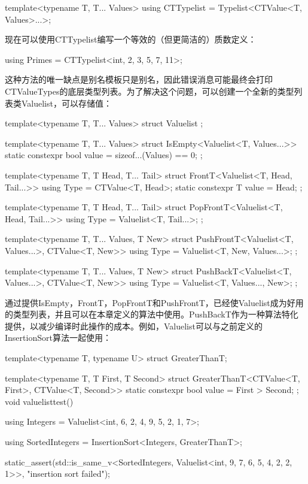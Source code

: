 \begin{cpp}
template<typename T, T... Values>
using CTTypelist = Typelist<CTValue<T, Values>...>;
\end{cpp}

现在可以使用CTTypelist编写一个等效的（但更简洁的）质数定义：

\begin{cpp}
using Primes = CTTypelist<int, 2, 3, 5, 7, 11>;
\end{cpp}

这种方法的唯一缺点是别名模板只是别名，因此错误消息可能最终会打印CTValueTypes的底层类型列表。为了解决这个问题，可以创建一个全新的类型列表类Valuelist，可以存储值：

\begin{cpp}
template<typename T, T... Values>
struct Valuelist {
};

template<typename T, T... Values>
struct IsEmpty<Valuelist<T, Values...>> {
	static constexpr bool value = sizeof...(Values) == 0;
};

template<typename T, T Head, T... Tail>
struct FrontT<Valuelist<T, Head, Tail...>> {
	using Type = CTValue<T, Head>;
	static constexpr T value = Head;
};

template<typename T, T Head, T... Tail>
struct PopFrontT<Valuelist<T, Head, Tail...>> {
	using Type = Valuelist<T, Tail...>;
};

template<typename T, T... Values, T New>
struct PushFrontT<Valuelist<T, Values...>, CTValue<T, New>> {
	using Type = Valuelist<T, New, Values...>;
};

template<typename T, T... Values, T New>
struct PushBackT<Valuelist<T, Values...>, CTValue<T, New>> {
	using Type = Valuelist<T, Values..., New>;
};
\end{cpp}

通过提供IsEmpty，FrontT，PopFrontT和PushFrontT，已经使Valuelist成为好用的类型列表，并且可以在本章定义的算法中使用。PushBackT作为一种算法特化提供，以减少编译时此操作的成本。例如，Valuelist可以与之前定义的InsertionSort算法一起使用：

\begin{cpp}
template<typename T, typename U>
struct GreaterThanT;

template<typename T, T First, T Second>
struct GreaterThanT<CTValue<T, First>, CTValue<T, Second>> {
	static constexpr bool value = First > Second;
};
void valuelisttest()
{
	using Integers = Valuelist<int, 6, 2, 4, 9, 5, 2, 1, 7>;
	
	using SortedIntegers = InsertionSort<Integers, GreaterThanT>;
	
	static_assert(std::is_same_v<SortedIntegers,
								Valuelist<int, 9, 7, 6, 5, 4, 2, 2, 1>>,
				"insertion sort failed");
}
\end{cpp}

